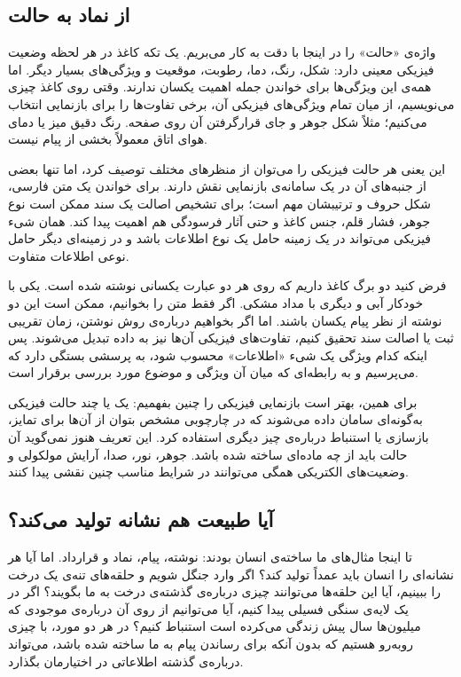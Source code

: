 \subsection{از نماد به حالت}
\label{sub:symbol-to-state}

واژه‌ی «حالت» را در اینجا با دقت به کار می‌بریم. یک تکه کاغذ در هر لحظه وضعیت فیزیکی معینی دارد: شکل، رنگ، دما، رطوبت، موقعیت و ویژگی‌های بسیار دیگر. اما همه‌ی این ویژگی‌ها برای خواندن جمله اهمیت یکسان ندارند. وقتی روی کاغذ چیزی می‌نویسیم، از میان تمام ویژگی‌های فیزیکی آن، برخی تفاوت‌ها را برای بازنمایی انتخاب می‌کنیم؛ مثلاً شکل جوهر و جای قرارگرفتن آن روی صفحه. رنگ دقیق میز یا دمای هوای اتاق معمولاً بخشی از پیام نیست.

این یعنی هر حالت فیزیکی را می‌توان از منظرهای مختلف توصیف کرد، اما تنها بعضی از جنبه‌های آن در یک سامانه‌ی بازنمایی نقش دارند. برای خواندن یک متن فارسی، شکل حروف و ترتیبشان مهم است؛ برای تشخیص اصالت یک سند ممکن است نوع جوهر، فشار قلم، جنس کاغذ و حتی آثار فرسودگی هم اهمیت پیدا کند. همان شیء فیزیکی می‌تواند در یک زمینه حامل یک نوع اطلاعات باشد و در زمینه‌ای دیگر حامل نوعی اطلاعات متفاوت.

فرض کنید دو برگ کاغذ داریم که روی هر دو عبارت یکسانی نوشته شده است. یکی با خودکار آبی و دیگری با مداد مشکی. اگر فقط متن را بخوانیم، ممکن است این دو نوشته از نظر پیام یکسان باشند. اما اگر بخواهیم درباره‌ی روش نوشتن، زمان تقریبی ثبت یا اصالت سند تحقیق کنیم، تفاوت‌های فیزیکی آن‌ها نیز به داده تبدیل می‌شوند. پس اینکه کدام ویژگی یک شیء «اطلاعات» محسوب شود، به پرسشی بستگی دارد که می‌پرسیم و به رابطه‌ای که میان آن ویژگی و موضوع مورد بررسی برقرار است.

برای همین، بهتر است بازنمایی فیزیکی را چنین بفهمیم: یک یا چند حالت فیزیکی به‌گونه‌ای سامان داده می‌شوند که در چارچوبی مشخص بتوان از آن‌ها برای تمایز، بازسازی یا استنباط درباره‌ی چیز دیگری استفاده کرد. این تعریف هنوز نمی‌گوید آن حالت باید از چه ماده‌ای ساخته شده باشد. جوهر، نور، صدا، آرایش مولکولی و وضعیت‌های الکتریکی همگی می‌توانند در شرایط مناسب چنین نقشی پیدا کنند.

\subsection{آیا طبیعت هم نشانه تولید می‌کند؟}
\label{sub:natural-traces-as-signs}

تا اینجا مثال‌های ما ساخته‌ی انسان بودند: نوشته، پیام، نماد و قرارداد. اما آیا هر نشانه‌ای را انسان باید عمداً تولید کند؟ اگر وارد جنگل شویم و حلقه‌های تنه‌ی یک درخت را ببینیم، آیا این حلقه‌ها می‌توانند چیزی درباره‌ی گذشته‌ی درخت به ما بگویند؟ اگر در یک لایه‌ی سنگی فسیلی پیدا کنیم، آیا می‌توانیم از روی آن درباره‌ی موجودی که میلیون‌ها سال پیش زندگی می‌کرده است استنباط کنیم؟ در هر دو مورد، با چیزی روبه‌رو هستیم که بدون آنکه برای رساندن پیام به ما ساخته شده باشد، می‌تواند درباره‌ی گذشته اطلاعاتی در اختیارمان بگذارد.


